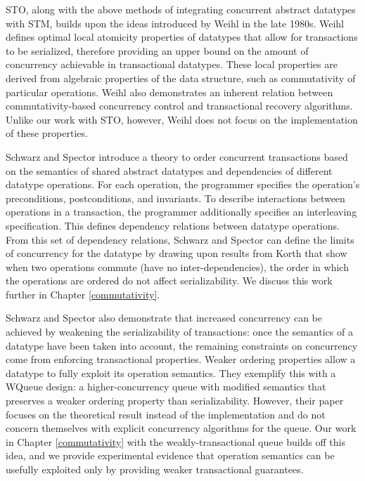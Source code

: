 STO, along with the above methods of integrating concurrent abstract datatypes with STM, builds upon the ideas introduced by Weihl in the late 1980s\cite{weihl}. Weihl defines optimal local atomicity properties of datatypes that allow for transactions to be serialized, therefore providing an upper bound on the amount of concurrency achievable in transactional datatypes. These local properties are derived from algebraic properties of the data structure, such as commutativity of particular operations. Weihl also demonstrates an inherent relation between commutativity-based concurrency control and transactional recovery algorithms. Unlike our work with STO, however, Weihl does not focus on the implementation of these properties.

Schwarz and Spector\cite{schwarz} introduce a theory to order concurrent transactions based on the semantics of shared abstract datatypes and dependencies of different datatype operations. For each operation, the programmer specifies the operation's preconditions, postconditions, and invariants. To describe interactions between operations in a transaction, the programmer additionally specifies an interleaving specification. This defines dependency relations between datatype operations. From this set of dependency relations, Schwarz and Spector can define the limits of concurrency for the datatype by drawing upon results from Korth\cite{korth} that show when two operations commute (have no inter-dependencies), the order in which the operations are ordered do not affect serializability. We discuss this work further in Chapter \ref{commutativity}. 

Schwarz and Spector also demonstrate that increased concurrency can be achieved by weakening the serializability of transactions: once the semantics of a datatype have been taken into account, the remaining constraints on concurrency come from enforcing transactional properties\cite{kung}. Weaker ordering properties allow a datatype to fully exploit its operation semantics. They exemplify this with a WQueue design: a higher-concurrency queue with modified semantics that preserves a weaker ordering property than serializability. However, their paper focuses on the theoretical result instead of the implementation and do not concern themselves with explicit concurrency algorithms for the queue. Our work in Chapter \ref{commutativity} with the weakly-transactional queue builds off this idea, and we provide experimental evidence that operation semantics can be usefully exploited only by providing weaker transactional guarantees.

